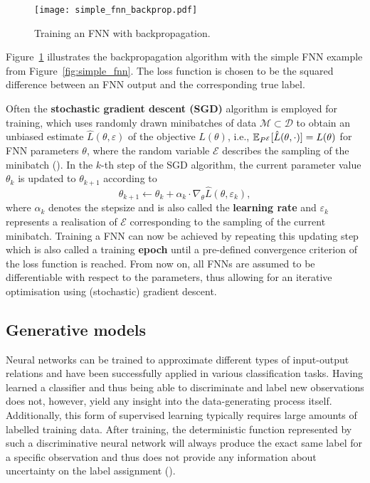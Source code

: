 \begin{figure}
	\texttt{[image: simple\_fnn\_backprop.pdf]}
	\caption{Training an FNN with backpropagation.}
	\label{fig:backprop}
\end{figure}

Figure~\ref{fig:backprop} illustrates the backpropagation algorithm with the simple FNN example from Figure~\ref{fig:simple_fnn}. The loss function is chosen to be the squared difference between an FNN output and the corresponding true label.

Often the \textbf{stochastic gradient descent (SGD)} algorithm is employed for training, which uses randomly drawn minibatches of data $\mathcal{M} \subset \mathcal{D}$ to obtain an unbiased estimate $\hat{L}(\theta, \varepsilon)$ of the objective $L(\theta)$, i.e., $\mathbb{E}_{P^{\mathcal{E}}}[\hat{L}(\theta, \cdot)] = L(\theta)$ for FNN parameters $\theta$, where the random variable $\mathcal{E}$ describes the sampling of the minibatch (\cite[p.~72]{Kingma2019}). In the $k$-th step of the SGD algorithm, the current parameter value $\theta_k$ is updated to $\theta_{k+1}$ according to
$$
	\theta_{k+1} \leftarrow \theta_k + \alpha_k \cdot \nabla_{\theta} \hat{L}(\theta, \varepsilon_k),
$$
where $\alpha_k$ denotes the stepsize and is also called the \textbf{learning rate} and $\varepsilon_k$ represents a realisation of $\mathcal{E}$ corresponding to the sampling of the current minibatch. 
Training a FNN can now be achieved by repeating this updating step which is also called a training \textbf{epoch} until a pre-defined convergence criterion of the loss function is reached. 
From now on, all FNNs are assumed to be differentiable with respect to the parameters, thus allowing for an iterative optimisation using (stochastic) gradient descent.

\subsection{Generative models}\label{sec:generative_model_examples}

Neural networks can be trained to approximate different types of input-output relations and have been successfully applied in various classification tasks.
Having learned a classifier and thus being able to discriminate and label new observations does not, however, yield any insight into the data-generating process itself. Additionally, this form of supervised learning typically requires large amounts of labelled training data. After training, the deterministic function represented by such a discriminative neural network will always produce the exact same label for a specific observation and thus does not provide any information about uncertainty on the label assignment (\cite[pp.~2f.]{Kingma2019}). 

